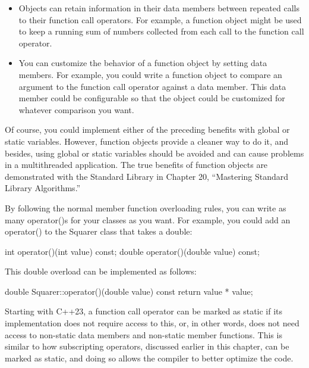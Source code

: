 \begin{itemize}
\item
Objects can retain information in their data members between repeated calls to their function call operators. For example, a function object might be used to keep a running sum of numbers collected from each call to the function call operator.

\item
You can customize the behavior of a function object by setting data members. For example, you could write a function object to compare an argument to the function call operator against a data member. This data member could be configurable so that the object could be customized for whatever comparison you want.
\end{itemize}

Of course, you could implement either of the preceding benefits with global or static variables. However, function objects provide a cleaner way to do it, and besides, using global or static variables should be avoided and can cause problems in a multithreaded application. The true benefits of function objects are demonstrated with the Standard Library in Chapter 20, “Mastering Standard Library Algorithms.”

By following the normal member function overloading rules, you can write as many operator()s for your classes as you want. For example, you could add an operator() to the Squarer class that takes a double:

\begin{cpp}
int operator()(int value) const;
double operator()(double value) const;
\end{cpp}

This double overload can be implemented as follows:

\begin{cpp}
double Squarer::operator()(double value) const { return value * value; }
\end{cpp}



Starting with C++23, a function call operator can be marked as static if its implementation does not require access to this, or, in other words, does not need access to non-static data members and non-static member functions. This is similar to how subscripting operators, discussed earlier in this chapter, can be marked as static, and doing so allows the compiler to better optimize the code.

